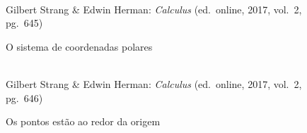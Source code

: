 \begin{figure}[H]
  \begin{center}
    \caption{O sistema de coordenadas polares}
    \label{fig:sistpolar}
    \\
    \footnotesize{Gilbert Strang \& Edwin Herman: \emph{Calculus}
          (ed.\ online, 2017, vol.\ 2, pg.\ 645)}
  \end{center}
\end{figure}

\begin{figure}[H]
   \begin{center}
     \caption{Os pontos estão ao redor da origem}
     \label{fig:sistpolar2}
     \\
     \footnotesize{Gilbert Strang \& Edwin Herman: \emph{Calculus}
          (ed.\ online, 2017, vol.\ 2, pg.\ 646)}
     \end{center}
\end{figure}



